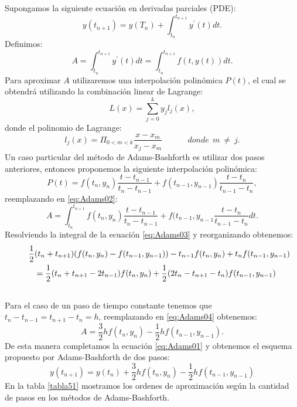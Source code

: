 \documentclass[a4paper,10pt, oneside]{book}
\begin{document}
Supongamos la siguiente ecuación en derivadas parciales (PDE):
\begin{equation}
 y(t_{n+1}) = y(T_n) + \int_{t_n}^{t_{n+1}} y^\prime (t) dt.
 \label{eq:Adams01}
\end{equation}
Definimos:
\begin{equation}
 A = \int_{t_n}^{t_{n+1}} y^\prime (t) dt = \int_{t_n}^{t_{n+1}} f(t,y(t)) dt.
 \label{eq:Adams02}
\end{equation}
Para aproximar $A$ utilizaremos una interpolación polinómica $P(t)$, el cual se obtendrá utilizando la combinación linear de Lagrange:
\begin{equation}
 L(x) = \sum_{j=0}^k y_j l_j(x), \nonumber
\end{equation}
donde el polinomio de Lagrange:
\begin{equation}
 l_j(x)  = \Pi_{0<m<k} \frac{x-x_m}{x_j-x_m}  ~~~~~~~~~~~~~~ donde ~~ m ~ \neq ~ j. \nonumber
\end{equation}
Un caso particular del método de Adams-Bashforth es utilizar dos pasos anteriores, entonces proponemos la siguiente interpolación polinómica:
\begin{equation}
 P(t) = f(t_n,y_n) \frac{t-t_{n-1}}{t_n - t_{n-1}} + f(t_{n-1},y_{n-1}) \frac{t-t_{n}}{t_{n-1}-t_n}, \nonumber
\end{equation}
reemplazando en \ref{eq:Adams02}:
\begin{equation}
 A = \int_{t_n}^{t_{n+1}} f(t_n,y_n) \frac{t-t_{n-1}}{t_n - t_{n-1}} + f(t_{n-1},y_{n-1} \frac{t-t_{n}}{t_{n-1}-t_n} dt.
 \label{eq:Adams03}
\end{equation}
Resolviendo la integral de la ecuación \ref{eq:Adams03} y reorganizando obtenemos:
\begin{eqnarray}
  \lefteqn{ \frac12 (t_n+t_{n+1})(f(t_n,y_n)-f(t_{n-1},y_{n-1}))-t_{n-1} f(t_n,y_n) + t_n f(t_{n-1},y_{n-1})} \nonumber \\
  && = \frac12 (t_n+t_{n+1} - 2 t_{n-1}) f(t_n , y_n) + \frac12 (2 t_n - t_{n+1} - t_n) f(t_{n-1} , y_{n-1}) \nonumber \\
  && ~~
 \label{eq:Adams04}
\end{eqnarray}
Para el caso de un paso de tiempo constante tenemos que $t_n - t_{n-1} = t_{n+1} - t_n = h$, reemplazando en \ref{eq:Adams04} obtenemos:
\begin{equation}
 A = \frac32 h f (t_n,y_n) - \frac12 h f(t_{n-1},y_{n-1}). \nonumber
\end{equation}
De esta manera completamos la ecuación \ref{eq:Adams01} y obtenemos el esquema propuesto por Adams-Bashforth de dos pasos:
\begin{equation}
 y(t_{n+1}) = y(t_n) + \frac32 h f(t_n,y_n) - \frac12 h f(t_{n-1},y_{n-1})
\end{equation}
En la tabla \ref{tabla51} mostramos los ordenes de aproximación según la cantidad de pasos en los métodos de Adams-Bashforth.
\end{document}
